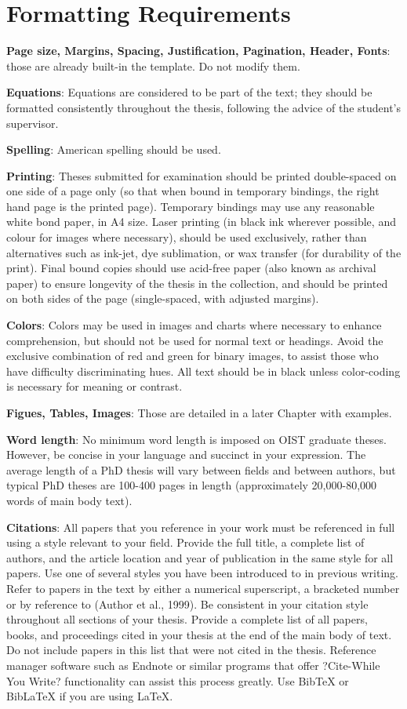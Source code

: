 \section{Formatting Requirements}

\textbf{Page size, Margins, Spacing, Justification, Pagination, Header, Fonts}: those are already built-in the template. Do not modify them.

\textbf{Equations}: Equations are considered to be part of the text; they should be formatted consistently throughout the thesis, following the advice of the student's supervisor.  

\textbf{Spelling}: American spelling should be used.

\textbf{Printing}:  Theses submitted for examination should be printed double-spaced on one side of a page only (so that when bound in temporary bindings, the right hand page is the printed page).  Temporary bindings may use any reasonable white bond paper, in A4 size.  Laser printing (in black ink wherever possible, and colour for images where necessary), should be used exclusively, rather than alternatives such as ink-jet, dye sublimation, or wax transfer (for durability of the print).  Final bound copies should use acid-free paper (also known as archival paper) to ensure longevity of the thesis in the collection, and should be printed on both sides of the page (single-spaced, with adjusted margins).

\textbf{Colors}:  Colors may be used in images and charts where necessary to enhance comprehension, but should not be used for normal text or headings.  Avoid the exclusive combination of red and green for binary images, to assist those who have difficulty discriminating hues.  All text should be in black unless color-coding is necessary for meaning or contrast.

\textbf{Figues, Tables, Images}: Those are detailed in a later Chapter with examples.

\textbf{Word length}:  No minimum word length is imposed on OIST graduate theses.  However, be concise in your language and succinct in your expression.  The average length of a PhD thesis will vary between fields and between authors, but typical PhD theses are 100-400 pages in length (approximately 20,000-80,000 words of main body text).  

\textbf{Citations}:  All papers that you reference in your work must be referenced in full using a style relevant to your field.  Provide the full title, a complete list of authors, and the article location and year of publication in the same style for all papers. Use one of several styles you have been introduced to in previous writing.  Refer to papers in the text by either a numerical superscript, a bracketed number or by reference to (Author et al., 1999).  Be consistent in your citation style throughout all sections of your thesis.  Provide a complete list of all papers, books, and proceedings cited in your thesis at the end of the main body of text.  Do not include papers in this list that were not cited in the thesis.  Reference manager software such as Endnote or similar programs that offer ?Cite-While You Write? functionality can assist this process greatly. Use BibTeX or BibLaTeX if you are using LaTeX.

